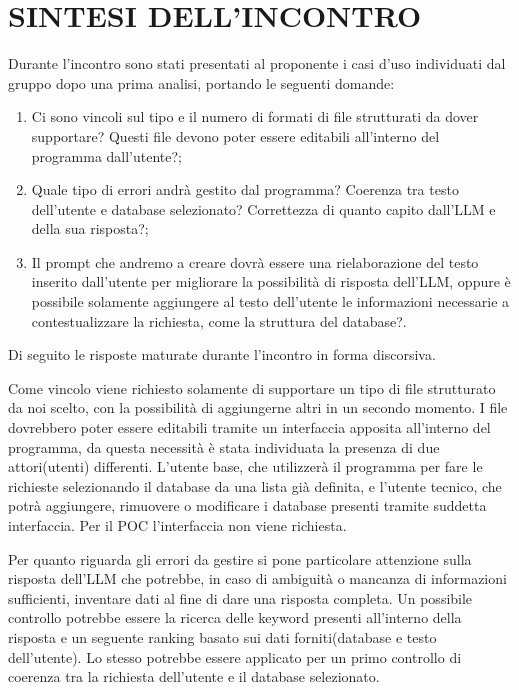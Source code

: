 \documentclass[5pt]{article}
\begin{document}
\section{SINTESI DELL'INCONTRO}
Durante l'incontro sono stati presentati al proponente i casi d'uso individuati dal gruppo dopo una prima analisi, portando le seguenti domande:
\begin{enumerate}
    \item Ci sono vincoli sul tipo e il numero di formati di file strutturati da dover supportare? Questi file devono poter essere editabili all'interno del programma dall'utente?;
    \item Quale tipo di errori andrà gestito dal programma? Coerenza tra testo dell'utente e database selezionato? Correttezza di quanto capito dall'LLM e della sua risposta?;
    \item Il prompt che andremo a creare dovrà essere una rielaborazione del testo inserito dall'utente per migliorare la possibilità di risposta dell'LLM, oppure è possibile solamente aggiungere al testo dell'utente le informazioni necessarie a contestualizzare la richiesta, come la struttura del database?. %
\end{enumerate}
Di seguito le risposte maturate durante l'incontro in forma discorsiva. %

Come vincolo viene richiesto solamente di supportare un tipo di file strutturato da noi scelto, con la possibilità di aggiungerne altri in un secondo momento. I file dovrebbero poter essere editabili tramite un interfaccia apposita all'interno del programma, da questa necessità è stata individuata la presenza di due attori(utenti) differenti. L'utente base, che utilizzerà il programma per fare le richieste selezionando il database da una lista già definita, e l'utente tecnico, che potrà aggiungere, rimuovere o modificare i database presenti tramite suddetta interfaccia.
Per il POC l'interfaccia non viene richiesta.

Per quanto riguarda gli errori da gestire si pone particolare attenzione sulla risposta dell'LLM che potrebbe, in caso di ambiguità o mancanza di informazioni sufficienti, inventare dati al fine di dare una risposta completa. Un possibile controllo potrebbe essere la ricerca delle keyword presenti all'interno della risposta e un seguente ranking basato sui dati forniti(database e testo dell'utente). Lo stesso potrebbe essere applicato per un primo controllo di coerenza tra la richiesta dell'utente e il database selezionato.
\end{document}
